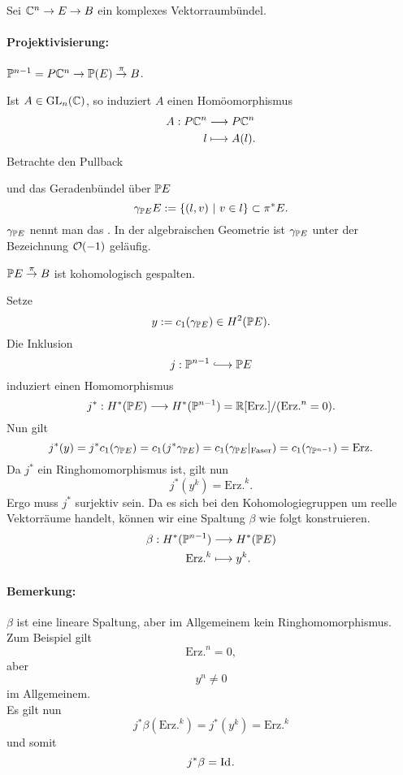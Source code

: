 
Sei $\C^n \pfeil{} E \pfeil{} B$ ein komplexes Vektorraumbündel.
\paragraph{Projektivisierung:}
$\P^{n-1} = P\C^n \pfeil{} \P(E) \pfeil{\pi} B$.

Ist $A \in \mathrm{GL}_n(\C)$, so induziert $A$ einen Homöomorphismus
\begin{align*}
A : P\C^{n} & \Pfeil{} P\C^n\\
l & \longmapsto A(l).
\end{align*}
Betrachte den Pullback
\begin{center}
\end{center}
und das Geradenbündel über $\P E$
\[ \gamma_{\P E}E := \set{(l,v) }{v \in l} \subset \pi^* E. \]
$\gamma_{\P E}$ nennt man das . In der algebraischen Geometrie ist $\gamma_{\P E}$ unter der Bezeichnung $\O(-1)$ geläufig.

\Prop{}
$\P E \pfeil{\pi} B$ ist kohomologisch gespalten.
\begin{Beweis}{}
Setze
\[ y:= c_1(\gamma_{\P E}) \in H^2(\P E) .\]
Die Inklusion
\[ j : \P^{n-1} \Inj{} \P E \]
induziert einen Homomorphismus
\[ j^* : H^*(\P E) \Pfeil{} H^*(\P^{n-1}) = \R[\mathrm{Erz.}] / (\mathrm{Erz.}^n = 0). \]
Nun gilt
\[ j^*(y) = j^*c_1(\gamma_{\P E}) = c_1(j^*\gamma_{\P E}) = c_1(\gamma_{\P E}|_{\mathrm{Faser}})
= c_1(\gamma_{\P^{n-1}}) = \mathrm{Erz.} \]
Da $j^*$ ein Ringhomomorphismus ist, gilt nun
\[ j^*(y^k) = \text{Erz.}^k. \]
Ergo muss $j^*$ surjektiv sein. Da es sich bei den Kohomologiegruppen um reelle Vektorräume handelt, können wir eine Spaltung $\beta$ wie folgt konstruieren.
\begin{align*}
\beta : H^*(\P^{n-1}) & \Pfeil{} H^*(\P E)\\
\mathrm{Erz.}^k & \longmapsto y^k.
\end{align*}
\paragraph{Bemerkung:} $\beta$ ist eine lineare Spaltung, aber im Allgemeinem kein Ringhomomorphismus. Zum Beispiel gilt
\[ \mathrm{Erz.}^n = 0, \]
aber
\[ y^n \neq 0 \]
im Allgemeinem.\\



Es gilt nun
\[ j^*\beta (\mathrm{Erz.}^k) = j^*(y^k) = \mathrm{Erz.}^k\]
und somit
\[ j^*\beta = \id{}. \]
\end{Beweis}


